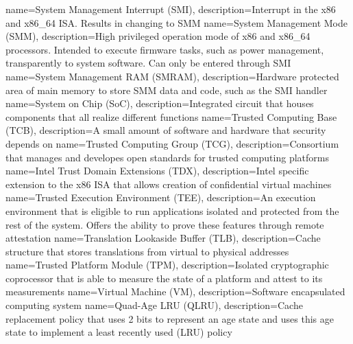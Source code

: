 {
  name=System Management Interrupt (SMI),
  description={Interrupt in the x86 and x86\_64 ISA. Results in changing to SMM}
}
{
  name=System Management Mode (SMM),
  description={High privileged operation mode of x86 and x86\_64 processors. Intended to execute firmware tasks, such
  as power management, transparently to system software. Can only be entered through SMI}
}
{
  name=System Management RAM (SMRAM),
  description={Hardware protected area of main memory to store SMM data and code, such as the
  SMI handler}
}
{
  name=System on Chip (SoC),
  description={Integrated circuit that houses components that all realize different functions}
}
%
{
  name=Trusted Computing Base (TCB),
  description={A small amount of software and hardware that security depends on}
}
{
  name=Trusted Computing Group (TCG),
  description={Consortium that manages and developes open standards for trusted computing platforms}
}
{
  name=Intel Trust Domain Extensions (TDX),
  description={Intel specific extension to the x86 ISA that allows creation of confidential virtual machines}
}
{
  name=Trusted Execution Environment (TEE),
  description={An execution environment that is eligible to run applications isolated and protected from the rest of
  the system. Offers the ability to prove these features through remote attestation}
}
{
  name=Translation Lookaside Buffer (TLB),
  description={Cache structure that stores translations from virtual to physical addresses}
}
{
  name=Trusted Platform Module (TPM),
  description={Isolated cryptographic coprocessor that is able to measure the state of a platform and attest to its measurements}
}
%
{
  name=Virtual Machine (VM),
  description={Software encapsulated computing system}
}
%
{
  name=Quad-Age LRU (QLRU),
  description={Cache replacement policy that uses 2 bits to represent an age state and uses this age state to implement
  a least recently used (LRU) policy}
}
